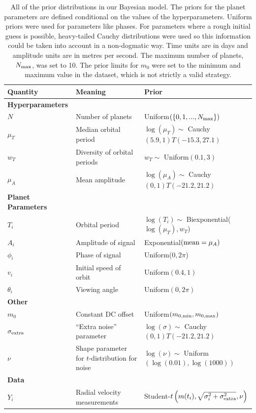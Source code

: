 \documentclass[useAMS,usenatbib]{mn2e}
\begin{document}
\begin{table}
\begin{tabular}{|l|l|l|}
\hline
Quantity	&	Meaning		& Prior\\
\hline
{\bf Hyperparameters}	&	\\
$N$		& Number of planets	& Uniform$(\{0, 1, ..., N_{\rm max}\})$\\
$\mu_T$		&	Median orbital period	& $\log(\mu_T) \sim$ Cauchy$(5.9, 1)T(-15.3, 27.1)$\\
$w_T$		&	Diversity of orbital periods & $w_T \sim$ Uniform$(0.1, 3)$\\
$\mu_A$		&	Mean amplitude	& $\log(\mu_A) \sim$ Cauchy$(0, 1)T(-21.2, 21.2)$\\
\hline
{\bf Planet Parameters}\\
$T_i$		&	Orbital period	&	$\log(T_i) \sim $ Biexponential($\log(\mu_T), w_T$)\\
$A_i$		&	Amplitude of signal	& Exponential$(\textnormal{mean}=\mu_A)$\\
$\phi_i$	&	Phase of signal	&	Uniform($0, 2\pi$)\\
$v_i$		&	Initial speed of orbit	&	Uniform$(0.4, 1)$\\
$\theta_i$	&	Viewing angle	&	Uniform$(0, 2\pi)$\\
\hline
{\bf Other}\\
$m_0$		&	Constant DC offset	&	Uniform$(m_{0, \rm min}, m_{0, \rm max})$\\
$\sigma_{\rm extra}$	& ``Extra noise'' parameter	& $\log(\sigma) \sim$ Cauchy$(0, 1)T(-21.2, 21.2)$\\
$\nu$		& Shape parameter for $t$-distribution for noise & $\log(\nu) \sim$ Uniform$(\log(0.01), \log(1000))$\\
\hline
{\bf Data}\\
$Y_i$		& Radial velocity measurements	&
		Student-$t\left(m(t_i), \sqrt{\sigma_i^2 + \sigma_{\rm extra}^2}, \nu\right)$
\end{tabular}
\caption{All of the prior distributions in our Bayesian model.
The priors for the planet parameters are defined conditional on the values
of the hyperparameters. Uniform priors were used for parameters like phases.
For parameters where a rough initial guess is possible, heavy-tailed Cauchy
distributions were used so this information could be taken into account
in a non-dogmatic way. Time units are in days and amplitude units are
in metres per second. The maximum number of planets, $N_{\rm max}$, was set
to 10. The prior limits for $m_0$ were set to the minimum and maximum value
in the dataset, which is not strictly a valid strategy.\label{tab:priors}}
\end{table}
\end{document}
